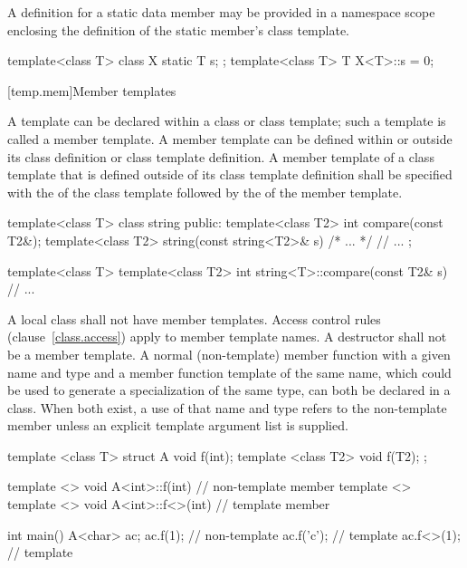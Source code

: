 \pnum
{}%
A definition for a static data member may be provided in a
namespace scope enclosing the definition of the static member's class template.
\enterexample

\begin{codeblock}
template<class T> class X {
	static T s;
};
template<class T> T X<T>::s = 0;
\end{codeblock}
\exitexampleb

[temp.mem]{Member templates}

\pnum
A template can be declared within a class or class template; such a template
is called a member template.
A member template can be defined within or outside its class definition or
class template definition.
A member template of a class template that is defined outside of its class
template definition shall be specified with the
of the class template followed by the
of the member template.
\enterexample

\begin{codeblock}
template<class T> class string {
public:
	template<class T2> int compare(const T2&);
	template<class T2> string(const string<T2>& s) { /* ... */ }
	// ...
};

template<class T> template<class T2> int string<T>::compare(const T2& s)
{
	// ...
}
\end{codeblock}
\exitexampleb

\pnum
A local class shall not have member templates.
Access control rules (clause~\ref{class.access})
apply to member template names.
A destructor shall not be a member
template.
A normal (non-template) member function with a given name
and type and a member function template of the same name, which could be
used to generate a specialization of the same type, can both be
declared in a class.
When both exist, a use of that name and type refers to the
non-template member unless an explicit template argument list is supplied.
\enterexample

\begin{codeblock}
template <class T> struct A {
	void f(int);
	template <class T2> void f(T2);
};

template <> void A<int>::f(int) { }                     // non-template member
template <> template <> void A<int>::f<>(int) { }       // template member

int main()
{
	A<char> ac;
	ac.f(1);		// non-template
	ac.f('c');		// template
	ac.f<>(1);		// template
}
\end{codeblock}
\exitexampleb


